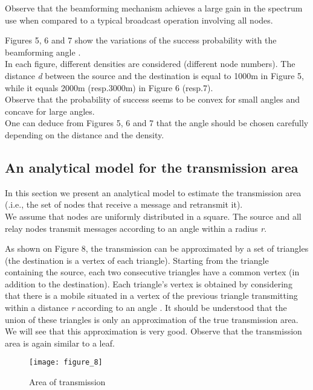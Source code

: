 \documentclass{IEEEtran}
\begin{document}
Observe that the beamforming mechanism achieves a large gain in the
spectrum use when compared to a typical broadcast operation
involving all nodes.

Figures 5, 6 and 7 show the variations of the success probability
with the beamforming angle .\\
In each figure, different densities are considered (different node
numbers). The distance \emph{d} between the source and the
destination is equal to 1000m in Figure 5, while it equals 2000m
(resp.3000m) in Figure 6 (resp.7).\\
Observe that the probability of success seems to be convex for small
angles and concave for large angles. \\
One can deduce from Figures 5, 6 and 7 that the angle should be
chosen carefully depending on the distance and the density.

\subsection{An analytical model for the transmission area}


In this section we present an analytical model to estimate the
transmission area (.i.e., the set of nodes that receive a message
and retransmit it). \\
We assume that nodes are uniformly distributed in a square. The
source and all relay nodes transmit messages according to an angle
 within a radius \emph{r}.

As shown on Figure 8, the transmission can be approximated by a set
of triangles (the destination is a vertex of each triangle).
Starting from the triangle containing the source, each two
consecutive triangles have a common vertex (in addition to the
destination). Each triangle's vertex is obtained by considering that
there is a mobile situated in a vertex of the previous triangle
transmitting within a distance \emph{r} according to an angle
. It should be understood that the union of these triangles
is only an approximation of the true transmission area. We will see
that this approximation is very good.  Observe that the transmission
area is again similar to a leaf.

\begin{figure}[!htbp]
  \begin{center}
\texttt{[image: figure\_8]}
  \end{center}
  \caption{Area of transmission}
\end{figure}
\end{document}
